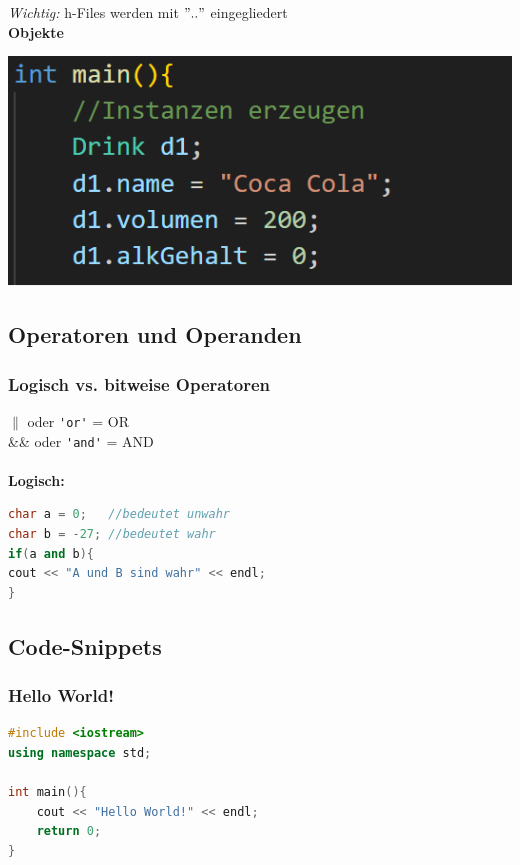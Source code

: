             \textit{Wichtig:} h-Files werden mit $".."$ eingegliedert
            \\
            \textbf{Objekte}
            
            \includegraphics[width=0.7\linewidth]{Bilder/cpp_klassen-objekte.png}


    \subsection{Operatoren und Operanden}

        \subsubsection{Logisch vs. bitweise Operatoren}
            $\parallel$ oder \verb|'or'| = OR\\
            \&\& oder \verb|'and'| = AND \\
            \\
            \textbf{Logisch:}
                \begin{lstlisting}[language=C++]
char a = 0;   //bedeutet unwahr
char b = -27; //bedeutet wahr
if(a and b){
cout << "A und B sind wahr" << endl;
}	
                \end{lstlisting}

    \subsection{Code-Snippets}

        \subsubsection{Hello World!}
            \begin{lstlisting}[language=C++]
#include <iostream>
using namespace std;

int main(){
    cout << "Hello World!" << endl;
    return 0;
}
            \end{lstlisting}
